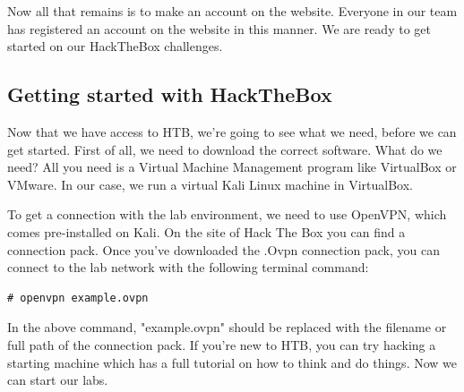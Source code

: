 \documentclass[../main.tex]{subfiles}
\begin{document}
Now all that remains is to make an account on the website. Everyone in our team has registered an account on the website in this manner. We are ready to get started on our HackTheBox challenges.

\subsection{Getting started with HackTheBox}
Now that we have access to HTB, we're going to see what we need, before we can get started. First of all, we need to download the correct software. What do we need? All you need is a Virtual Machine Management program like VirtualBox or VMware. In our case, we run a virtual Kali Linux machine in VirtualBox.

To get a connection with the lab environment, we need to use OpenVPN, which comes pre-installed on Kali. On the site of Hack The Box you can find a connection pack. Once you've downloaded the .Ovpn connection pack, you can connect to the lab network with the following terminal command:

\begin{lstlisting}
# openvpn example.ovpn
\end{lstlisting}

In the above command, "example.ovpn" should be replaced with the filename or full path of the connection pack. If you're new to HTB, you can try hacking a starting machine which has a full tutorial on how to think and do things. Now we can start our labs.
\end{document}
